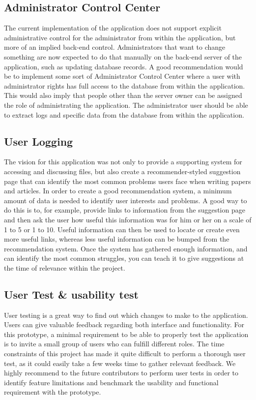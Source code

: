 \subsection{Administrator Control Center}
The current implementation of the application does not support explicit administrative control for the administrator from within the application, but more of an implied back-end control. Administrators that want to change something are now expected to do that manually on the back-end server of the application, such as updating database records. A good recommendation would be to implement some sort of Administrator Control Center where a user with administrator rights has full access to the database from within the application. This would also imply that people other than the server owner can be assigned the role of administrating the application. The administrator user should be able to extract logs and specific data from the database from within the application.

\subsection{User Logging}
The vision for this application was not only to provide a supporting system for accessing and discussing files, but also create a recommender-styled suggestion page that can identify the most common problems users face when writing papers and articles.
In order to create a good recommendation system, a minimum amount of data is needed to identify user interests and problems.
A good way to do this is to, for example, provide links to information from the suggestion page and then ask the user
how useful this information was for him or her on a scale of 1 to 5 or 1 to 10. Useful information can then be used to locate
or create even more useful links, whereas less useful information can be bumped from the recommendation system. Once the system
has gathered enough information, and can identify the most common struggles, you can teach it to give suggestions at the time
of relevance within the project. 

\subsection{User Test \& usability test} %
\label{sub:user_test}
User testing is a great way to find out which changes to make to the application. Users can give valuable feedback regarding both interface and functionality. For this prototype, a minimal requirement to be able to properly test the application is to invite a small group of users who can fulfill different roles. The time constraints of this project has made it quite difficult to perform a thorough user test, as it could easily take a few weeks time to gather relevant feedback. We highly recommend to the future contributors to perform user tests in order to identify feature limitations and benchmark the usability and functional requirement with the prototype.
